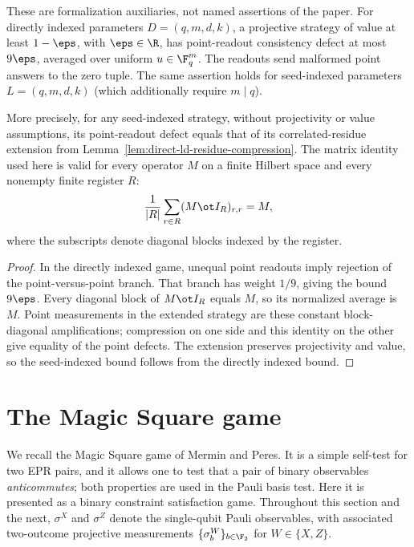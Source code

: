 \begin{theorem}
\label{lem:ld-point-agreement}
\leanok
{}
These are formalization auxiliaries, not named assertions of the paper.
For directly indexed parameters $D=(q,m,d,k)$, a projective strategy of
value at least $1-\eps$, with $\eps\in\R$, has point-readout consistency
defect at most $9\eps$, averaged over uniform $u\in\F_q^m$.
The readouts send malformed point answers to the zero tuple.
The same assertion holds for seed-indexed parameters $L=(q,m,d,k)$
(which additionally require $m\mid q$).

More precisely, for any seed-indexed strategy, without projectivity or
value assumptions, its point-readout defect equals that of its
correlated-residue extension from Lemma~\ref{lem:direct-ld-residue-compression}.
The matrix identity used here is valid for every operator $M$ on a finite
Hilbert space and every nonempty finite register $R$:
\[
 \frac1{|R|}\sum_{r\in R}
 (M\ot I_R)_{r,r}=M,
\]
where the subscripts denote diagonal blocks indexed by the register.
\end{theorem}
\begin{proof}
\leanok
{}
In the directly indexed game, unequal point readouts imply rejection of
the point-versus-point branch. That branch has weight $1/9$, giving the
bound $9\eps$. Every diagonal block of $M\ot I_R$ equals $M$, so its
normalized average is $M$. Point measurements in the extended strategy
are these constant block-diagonal amplifications; compression on one side
and this identity on the other give equality of the point defects.
The extension preserves projectivity and value, so the seed-indexed bound
follows from the directly indexed bound.
\end{proof}

\section{The Magic Square game}
\label{sec:ms}

We recall the Magic Square game of Mermin and Peres. It is a simple self-test for two EPR pairs, and it allows one to test that a pair of binary observables \emph{anticommutes}; both properties are used in the Pauli basis test. Here it is presented as a binary constraint satisfaction game. Throughout this section and the next, $\sigma^X$ and $\sigma^Z$ denote the single-qubit Pauli observables, with associated two-outcome projective measurements $\{\sigma^W_b\}_{b \in \F_2}$ for $W \in \{X,Z\}$.

